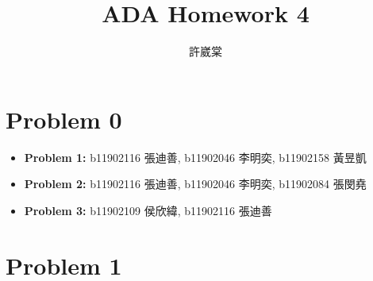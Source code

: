 \documentclass{homework}
\author{許崴棠}
\title{ADA Homework 4}
\begin{document}
\maketitle
\section*{Problem 0}
\begin{itemize}
    \item \textbf{Problem 1:} b11902116 張迪善, b11902046 李明奕, b11902158 黃昱凱
    \item \textbf{Problem 2:} b11902116 張迪善, b11902046 李明奕, b11902084 張閔堯
    \item \textbf{Problem 3:} b11902109 侯欣緯, b11902116 張迪善
\end{itemize}
\clearpage
\section*{Problem 1}
\end{document}
